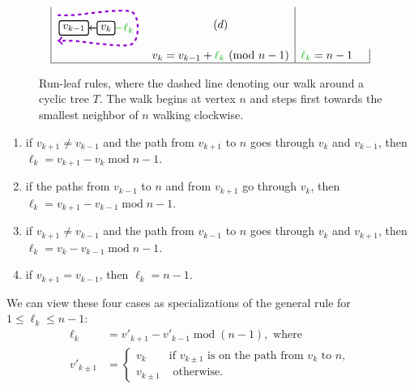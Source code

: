 \documentclass[a4paper,10pt,leqno]{amsart}
\numberwithin{equation}{section}
\theoremstyle{definition}
\theoremstyle{remark}
\renewcommand{\mod}{\;\mathrm{mod}\;}
\begin{document}
\begin{figure}[htbp]
\[\begin{array}{|lc|cr|}
\raisebox{-.5\height}{\begin{tikzpicture}
\node[draw,rounded corners=2pt,inner sep=3pt,thick,minimum width=1ex] (0) at (0,0) {$v_{k-1}$};
\node[draw,rounded corners=2pt,inner sep=3pt,thick,minimum width=1ex] (1) at (1,0) {$v_{k}$};
\node[darkblue] (l) at (1.7,0) {\tiny $\ell_{k}$};
\draw[-,darkblue] (1.3,0) to (1.5,0);
\draw[<-,thick] (0) to (1);
\draw[->,dashed,ultra thick, darkred] plot [smooth] coordinates {(-.5,.4) (0,0.4) (1.8,0.5) (1.8,-0.5) (0,-0.4) (-.5,-.4)};
\end{tikzpicture}} & (d)
\\
& v_{k} = v_{k-1} + {\color{darkblue}{\ell_k}} \ (\mathrm{mod}\ n-1) &
{\color{darkblue}{\ell_k}}=n-1 &
\\ \hline
\end{array}\]
\caption{Run-leaf rules, where the dashed line denoting our walk around a cyclic tree $T$. The walk begins at vertex $n$ and steps first towards the smallest neighbor of $n$ walking clockwise.}
\label{fig:runleaflabels}
\end{figure}

\begin{enumerate}[label=(\alph*)]
\item if $v_{k+1}\neq v_{k-1}$ and the path from $v_{k+1}$ to $n$ goes through $v_k$ and $v_{k-1}$, then $\ell_k=v_{k+1}-v_{k} \mod n-1$.
\item if the paths from $v_{k-1}$ to $n$ and from $v_{k+1}$ go through $v_k$, then $\ell_k=v_{k+1}-v_{k-1} \mod n-1$.
\item if $v_{k+1}\neq v_{k-1}$ and the path from $v_{k-1}$ to $n$ goes through $v_k$ and $v_{k+1}$, then $\ell_k=v_{k}-v_{k-1} \mod n-1$.
\item if $v_{k+1}= v_{k-1}$, then $\ell_k = n-1$.
\end{enumerate}

We can view these four cases as specializations of the general rule for $1\leq \ell_k \leq n-1$:
\begin{align*}
\ell_k &= v'_{k+1} - v'_{k-1} \mod (n-1), \text{ where } \\
v'_{k\pm 1}&=\begin{cases} v_{k} & \text{if }v_{k\pm 1}\text{ is on the path from }v_k\text{ to }n, \\ v_{k\pm 1} & \text{ otherwise.} \end{cases}
\end{align*}
\end{document}
